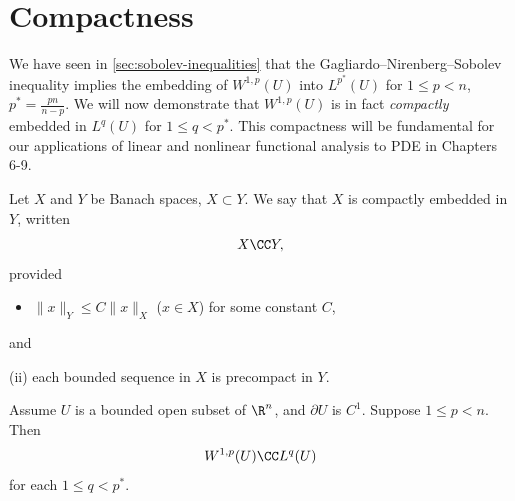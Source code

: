 \section{Compactness}
\label{sec:sobolev-compactness}

We have seen in \cref{sec:sobolev-inequalities} that the Gagliardo--Nirenberg--Sobolev inequality implies the embedding of $W^{1,p}(U)$ into $L^{p^*}(U)$ for $1 \le p < n$, $p^* = \frac{pn}{n-p}$. We will now demonstrate that $W^{1,p}(U)$ is in fact \textit{compactly} embedded in $L^q(U)$ for $1 \le q < p^*$. This compactness will be fundamental for our applications of linear and nonlinear functional analysis to PDE in Chapters 6-9.

\begin{definition}
\label{def:compact-embedding}
Let $X$ and $Y$ be Banach spaces, $X \subset Y$. We say that $X$ is compactly embedded in $Y$, written
$$X \CC Y,$$
provided
\begin{itemize}
\item[(i)] $\|x\|_Y \le C\|x\|_X$ ($x \in X$) for some constant $C$,
\end{itemize}
and

(ii) each bounded sequence in $X$ is precompact in $Y$.
\end{definition}

\begin{theorem}
\label{thm:rellich-kondrachov}
Assume $U$ is a bounded open subset of $\R^n$, and $\partial U$ is $C^1$. Suppose $1 \le p < n$. Then
$$W^{1,p}(U) \CC L^q(U)$$
for each $1 \le q < p^*$.
\end{theorem}

